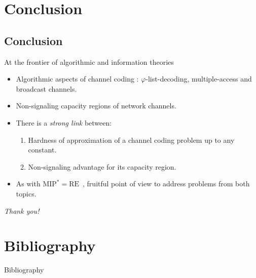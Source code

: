 \documentclass{beamer}
\theoremstyle{definition}
\theoremstyle{remark}
\begin{document}
\section{Conclusion}
\subsection{Conclusion}
\begin{frame}{At the frontier of algorithmic and information theories}
  \begin{itemize}
  \item Algorithmic aspects of channel coding : $\varphi$-list-decoding, multiple-access and broadcast channels.
  \item Non-signaling capacity regions of network channels.
    \pause
    \bigskip
  \item There is a \emph{strong link} between:
    \begin{enumerate}
    \item Hardness of approximation of a channel coding problem up to any constant.
    \item Non-signaling advantage for its capacity region.
    \end{enumerate}
  \item As with $\mathrm{MIP}^*=\mathrm{RE}$~\cite{JNVWY20}, fruitful point of view to address problems from both topics.
  \end{itemize}
  \pause
  \bigskip
  \begin{center}
    \huge{\emph{Thank you!}}
  \end{center}
\end{frame}

\appendix
\section{Bibliography}
\begin{frame}[allowframebreaks]{Bibliography}
  
  
\end{frame}

\end{document}
